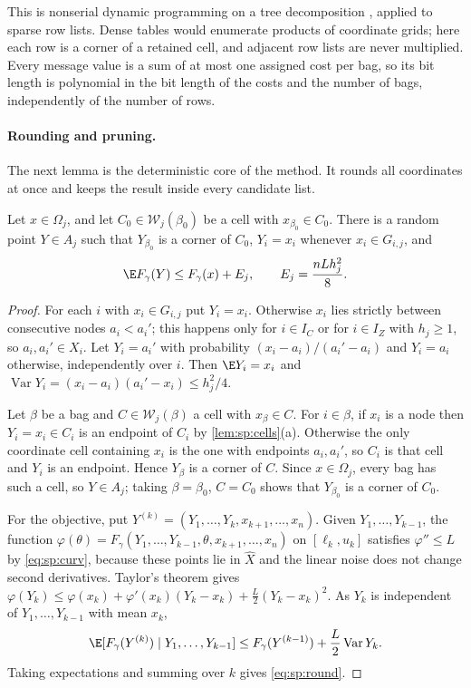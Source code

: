 This is nonserial dynamic programming on a tree decomposition
\citep{bertele1972-nonserial-dynamic-programming}, applied to sparse row lists. Dense tables
would enumerate products of coordinate grids; here each row is a corner of a
retained cell, and adjacent row lists are never multiplied. Every message
value is a sum of at most one assigned cost per bag, so its bit length is
polynomial in the bit length of the costs and the number of bags,
independently of the number of rows.

\paragraph{Rounding and pruning.}
The next lemma is the deterministic core of the method. It rounds all
coordinates at once and keeps the result inside every candidate list.

\begin{lemma}\label{lem:sp:round}
Let $x\in\Omega_j$, and let $C_0\in\mathcal W_j(\beta_0)$ be a cell with
$x_{\beta_0}\in C_0$. There is a random point $Y\in A_j$ such that
$Y_{\beta_0}$ is a corner of $C_0$, $Y_i=x_i$ whenever $x_i\in G_{i,j}$, and
\begin{equation}\label{eq:sp:round}
 \E F_\gamma(Y)\le F_\gamma(x)+E_j,\qquad E_j=\frac{nLh_j^2}{8}.
\end{equation}
\end{lemma}

\begin{proof}
For each $i$ with $x_i\in G_{i,j}$ put $Y_i=x_i$. Otherwise $x_i$ lies
strictly between consecutive nodes $a_i<a_i'$; this happens only for
$i\in I_C$ or for $i\in I_Z$ with $h_j\ge1$, so $a_i,a_i'\in X_i$. Let
$Y_i=a_i'$ with probability $(x_i-a_i)/(a_i'-a_i)$ and $Y_i=a_i$ otherwise,
independently over $i$. Then $\E Y_i=x_i$ and
$\operatorname{Var}Y_i=(x_i-a_i)(a_i'-x_i)\le h_j^2/4$.

Let $\beta$ be a bag and $C\in\mathcal W_j(\beta)$ a cell with $x_\beta\in
C$. For $i\in\beta$, if $x_i$ is a node then $Y_i=x_i\in C_i$ is an endpoint
of $C_i$ by \cref{lem:sp:cells}(a). Otherwise the only coordinate cell
containing $x_i$ is the one with endpoints $a_i,a_i'$, so $C_i$ is that cell
and $Y_i$ is an endpoint. Hence $Y_\beta$ is a corner of $C$. Since
$x\in\Omega_j$, every bag has such a cell, so $Y\in A_j$; taking
$\beta=\beta_0$, $C=C_0$ shows that $Y_{\beta_0}$ is a corner of $C_0$.

For the objective, put $Y^{(k)}=(Y_1,\dots,Y_k,x_{k+1},\dots,x_n)$. Given
$Y_1,\dots,Y_{k-1}$, the function
$\varphi(\theta)=F_\gamma(Y_1,\dots,Y_{k-1},\theta,x_{k+1},\dots,x_n)$ on
$[\ell_k,u_k]$ satisfies $\varphi''\le L$ by \eqref{eq:sp:curv}, because
these points lie in $\widehat X$ and the linear noise does not change second
derivatives. Taylor's theorem gives
$\varphi(Y_k)\le\varphi(x_k)+\varphi'(x_k)(Y_k-x_k)+\frac L2(Y_k-x_k)^2$.
As $Y_k$ is independent of $Y_1,\dots,Y_{k-1}$ with mean $x_k$,
\[
 \E[F_\gamma(Y^{(k)})\mid Y_1,\dots,Y_{k-1}]\le F_\gamma(Y^{(k-1)})
 +\frac L2\operatorname{Var}Y_k .
\]
Taking expectations and summing over $k$ gives \eqref{eq:sp:round}.
\end{proof}

